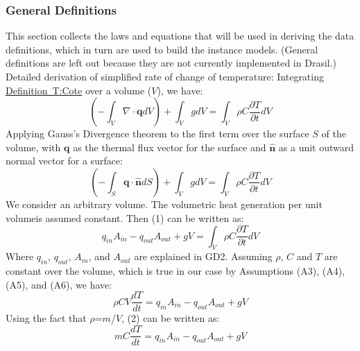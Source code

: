 \documentclass[12pt]{article}
\begin{document}
\subsubsection{General Definitions}
\label{Sec:GD}
This section collects the laws and equations that will be used in deriving the data definitions, which in turn are used to build the instance models. (General definitions are left out because they are not currently implemented in Drasil.)
Detailed derivation of simplified rate of change of temperature:
Integrating \hyperref[T:Cote]{Definition~T:Cote} over a volume ($V$), we have:
\begin{equation}
(-\int_{V}{\nabla{}\cdot{}\mathbf{q}dV})+\int_{V}{gdV}=\int_{V}{\rho{}C\frac{\partial{}T}{\partial{}t}dV}
\end{equation}
Applying Gauss's Divergence theorem to the first term over the surface $S$ of the volume, with $\mathbf{q}$ as the thermal flux vector for the surface and $\mathbf{\hat{n}}$ as a unit outward normal vector for a surface:
\begin{equation}
(-\int_{S}{\mathbf{q}\cdot{}\mathbf{\hat{n}}dS})+\int_{V}{gdV}=\int_{V}{\rho{}C\frac{\partial{}T}{\partial{}t}dV}
\end{equation}
We consider an arbitrary volume. The volumetric heat generation per unit volumeis assumed constant. Then (1) can be written as:
\begin{equation}
q_{in}A_{in}-q_{out}A_{out}+gV=\int_{V}{\rho{}C\frac{\partial{}T}{\partial{}t}dV}
\end{equation}
Where $q_{in}$, $q_{out}$, $A_{in}$, and $A_{out}$ are explained in GD2. Assuming $\rho{}$, $C$ and $T$ are constant over the volume, which is true in our case by Assumptions (A3), (A4), (A5), and (A6), we have:
\begin{equation}
\rho{}CV\frac{dT}{dt}=q_{in}A_{in}-q_{out}A_{out}+gV
\end{equation}
Using the fact that $\rho{}$=$m$/$V$, (2) can be written as:
\begin{equation}
mC\frac{dT}{dt}=q_{in}A_{in}-q_{out}A_{out}+gV
\end{equation}
\end{document}
